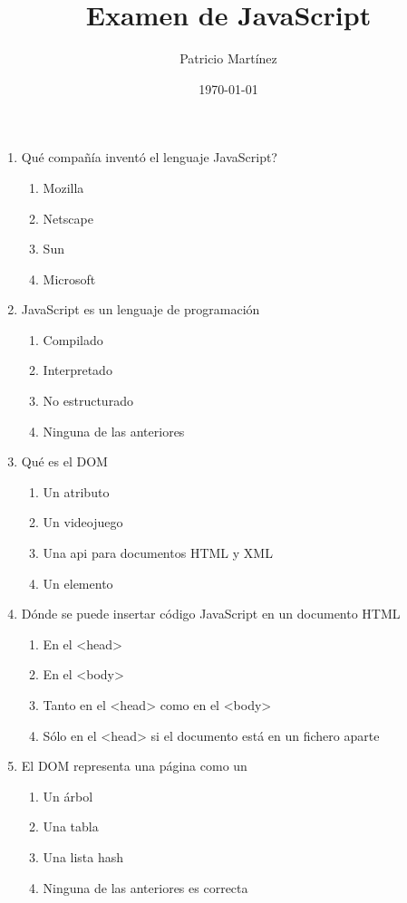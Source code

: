 \documentclass[addpoints, 12]{exam}
\author{Patricio Martínez}
\date{\today}
\title{Examen de JavaScript}
\begin{document}
\maketitle
\begin{enumerate}
\item Qué compañía inventó el lenguaje JavaScript?

\begin{enumerate}
\item Mozilla
\item Netscape
\item Sun
\item Microsoft
\end{enumerate}

\item JavaScript es un lenguaje de programación

\begin{enumerate}
\item Compilado
\item Interpretado
\item No estructurado
\item Ninguna de las anteriores
\end{enumerate}

\item Qué es el DOM

\begin{enumerate}
\item Un atributo
\item Un videojuego
\item Una api para documentos HTML y XML
\item Un elemento
\end{enumerate}

\item Dónde se puede insertar código JavaScript en un documento HTML

\begin{enumerate}
\item En el <head>
\item En el <body>
\item Tanto en el <head> como en el <body>
\item Sólo en el <head> si el documento está en un fichero aparte
\end{enumerate}

\item El DOM representa una página como un

\begin{enumerate}
\item Un árbol
\item Una tabla
\item Una lista hash
\item Ninguna de las anteriores es correcta
\end{enumerate}


\end{enumerate}
\end{document}
